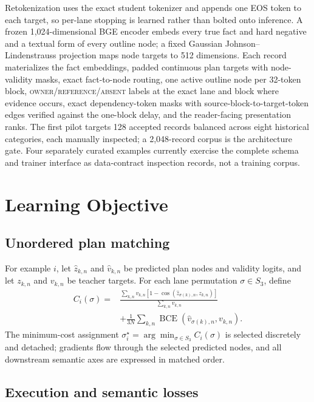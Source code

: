 \documentclass[10pt]{article}
\newcommand{\BCE}{\operatorname{BCE}}
\begin{document}
Retokenization uses the exact student tokenizer and appends one EOS token to
each target, so per-lane stopping is learned rather than bolted onto
inference. A frozen 1,024-dimensional BGE encoder \citep{xiao2023cpack}
embeds every true fact and hard negative and a textual form of every outline
node; a fixed Gaussian Johnson--Lindenstrauss projection maps node targets to
512 dimensions. Each record materializes the fact embeddings, padded
continuous plan targets with node-validity masks, exact fact-to-node routing,
one active outline node per 32-token block,
\textsc{owner}/\textsc{reference}/\textsc{absent} labels at the exact lane
and block where evidence occurs, exact dependency-token masks with
source-block-to-target-token edges verified against the one-block delay, and
the reader-facing presentation ranks. The first pilot targets 128 accepted
records balanced across eight historical categories, each manually inspected;
a 2,048-record corpus is the architecture gate. Four separately curated
examples currently exercise the complete schema and trainer interface as
data-contract inspection records, not a training corpus.

\section{Learning Objective}
\label{sec:objective}

\subsection{Unordered plan matching}

For example \(i\), let \(\hat z_{k,n}\) and \(\hat v_{k,n}\) be predicted
plan nodes and validity logits, and let \(z_{k,n}\) and \(v_{k,n}\) be
teacher targets. For each lane permutation \(\sigma\in S_3\), define
\begin{align}
C_i(\sigma)
={}&
\frac{
\sum_{k,n} v_{k,n}
\left[1-\cos(\hat z_{\sigma(k),n},z_{k,n})\right]
}{
\sum_{k,n} v_{k,n}
}
\nonumber\\
&+
\frac{1}{3N}\sum_{k,n}
\BCE\!\left(\hat v_{\sigma(k),n},v_{k,n}\right).
\end{align}
The minimum-cost assignment
\(
\sigma_i^\star=\arg\min_{\sigma\in S_3} C_i(\sigma)
\)
is selected discretely and detached; gradients flow through the selected
predicted nodes, and all downstream semantic axes are expressed in matched
order.

\subsection{Execution and semantic losses}
\end{document}
